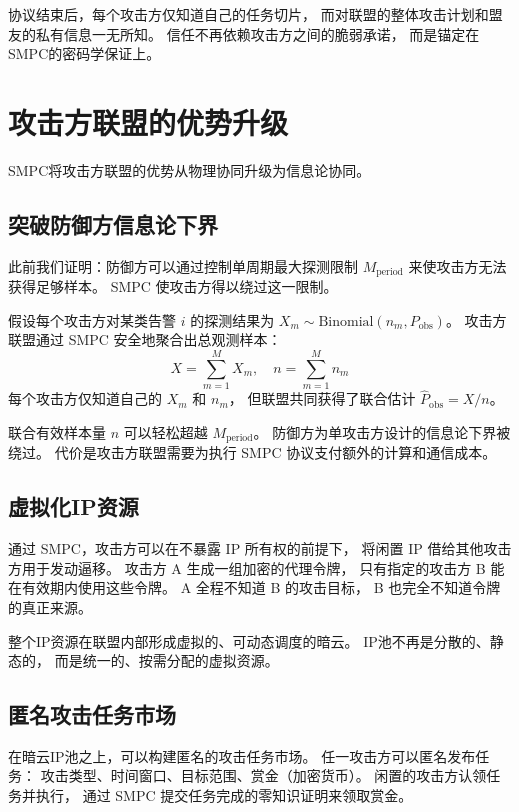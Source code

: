 \documentclass[11pt,a4paper]{article}
\begin{document}
协议结束后，每个攻击方仅知道自己的任务切片，
而对联盟的整体攻击计划和盟友的私有信息一无所知。
信任不再依赖攻击方之间的脆弱承诺，
而是锚定在SMPC的密码学保证上。

\section{攻击方联盟的优势升级}

SMPC将攻击方联盟的优势从物理协同升级为信息论协同。

\subsection{突破防御方信息论下界}

此前我们证明：防御方可以通过控制单周期最大探测限制 \(M_{\text{period}}\)
来使攻击方无法获得足够样本。
SMPC 使攻击方得以绕过这一限制。

假设每个攻击方对某类告警 \(i\) 的探测结果为
\(X_m \sim \text{Binomial}(n_m, P_{\text{obs}})\)。
攻击方联盟通过 SMPC 安全地聚合出总观测样本：
\[
X = \sum_{m=1}^{M} X_m, \quad n = \sum_{m=1}^{M} n_m
\]
每个攻击方仅知道自己的 \(X_m\) 和 \(n_m\)，
但联盟共同获得了联合估计 \(\hat{P}_{\text{obs}} = X/n\)。

联合有效样本量 \(n\) 可以轻松超越 \(M_{\text{period}}\)。
防御方为单攻击方设计的信息论下界被绕过。
代价是攻击方联盟需要为执行 SMPC 协议支付额外的计算和通信成本。

\subsection{虚拟化IP资源}

通过 SMPC，攻击方可以在不暴露 IP 所有权的前提下，
将闲置 IP 借给其他攻击方用于发动逼移。
攻击方 A 生成一组加密的代理令牌，
只有指定的攻击方 B 能在有效期内使用这些令牌。
A 全程不知道 B 的攻击目标，
B 也完全不知道令牌的真正来源。

整个IP资源在联盟内部形成虚拟的、可动态调度的暗云。
IP池不再是分散的、静态的，
而是统一的、按需分配的虚拟资源。

\subsection{匿名攻击任务市场}

在暗云IP池之上，可以构建匿名的攻击任务市场。
任一攻击方可以匿名发布任务：
攻击类型、时间窗口、目标范围、赏金（加密货币）。
闲置的攻击方认领任务并执行，
通过 SMPC 提交任务完成的零知识证明来领取赏金。
\end{document}
